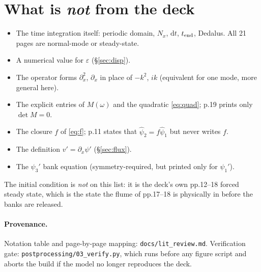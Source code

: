 \documentclass[11pt]{article}
\newcommand{\code}[1]{\texttt{\small #1}}
\newcommand{\po}{\psi_1'}
\newcommand{\ph}{\psi_3'}
\newcommand{\dx}{\partial_x}
\begin{document}
\section{What is \emph{not} from the deck}

\begin{itemize}\itemsep2pt
\item The time integration itself: periodic domain, $N_x$, $\mathrm dt$, $t_{\rm end}$,
      Dedalus. All 21 pages are normal-mode or steady-state.
\item A numerical value for $\varepsilon$ (\S\ref{sec:disp}).
\item The operator forms $\dx^{2}$, $\dx$ in place of $-k^{2}$, $ik$ (equivalent for one
      mode, more general here).
\item The explicit entries of $M(\omega)$ and the quadratic \eqref{eq:quad}; p.19 prints
      only $\det M=0$.
\item The closure $f$ of \eqref{eq:f}; p.11 states that $\hat\psi_2=f\hat\psi_1$ but never
      writes $f$.
\item The definition $v'=\dx\psi'$ (\S\ref{sec:flux}).
\item The $\ph$ bank equation (symmetry-required, but printed only for $\po$).
\end{itemize}

The initial condition is \emph{not} on this list: it is the deck's own pp.12--18 forced
steady state, which is the state the flume of pp.17--18 is physically in before the banks
are released.

\paragraph{Provenance.} Notation table and page-by-page mapping: \code{docs/lit\_review.md}.
Verification gate: \code{postprocessing/03\_verify.py}, which runs before any figure script
and aborts the build if the model no longer reproduces the deck.
\end{document}
